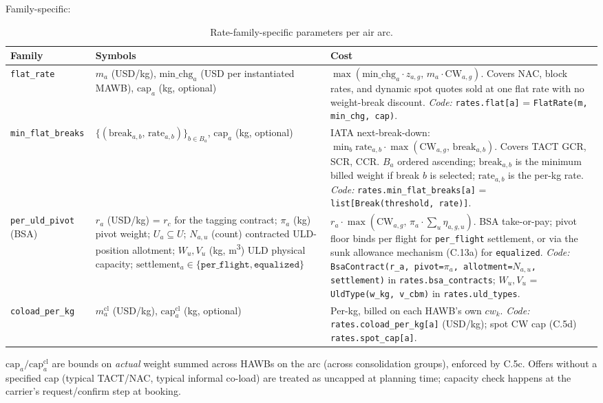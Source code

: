 \documentclass[11pt,a4paper]{article}
\theoremstyle{definition}
\begin{document}
Family-specific:

\begin{table}[H]
\centering
\caption{Rate-family-specific parameters per air arc.}
\label{tab:rate-family-params}
\begin{tabular}{lp{4.6cm}p{6.5cm}}
\toprule
Family & Symbols & Cost \\
\midrule
\texttt{flat\_rate} & $m_a$ (USD/kg), $\text{min\_chg}_a$ (USD per instantiated MAWB), $\text{cap}_a$ (kg, optional) & $\max(\text{min\_chg}_a \cdot z_{a,g},\, m_a \cdot \text{CW}_{a,g})$. Covers NAC, block rates, and dynamic spot quotes sold at one flat rate with no weight-break discount. \emph{Code:} \texttt{rates.flat[a]} = \texttt{FlatRate(m, min\_chg, cap)}. \\[0.3em]
\texttt{min\_flat\_breaks} & $\{(\text{break}_{a,b},\, \text{rate}_{a,b})\}_{b \in B_a}$, $\text{cap}_a$ (kg, optional) & IATA next-break-down: $\min_b \text{rate}_{a,b} \cdot \max(\text{CW}_{a,g},\, \text{break}_{a,b})$. Covers TACT GCR, SCR, CCR. $B_a$ ordered ascending; $\text{break}_{a,b}$ is the minimum billed weight if break $b$ is selected; $\text{rate}_{a,b}$ is the per-kg rate. \emph{Code:} \texttt{rates.min\_flat\_breaks[a]} = \texttt{list[Break(threshold, rate)]}. \\[0.3em]
\texttt{per\_uld\_pivot} (BSA) & $r_a$ (USD/kg) = $r_c$ for the tagging contract; $\pi_a$ (kg) pivot weight; $U_a \subseteq U$; $N_{a,u}$ (count) contracted ULD-position allotment; $W_u, V_u$ (kg, m\textsuperscript{3}) ULD physical capacity; $\text{settlement}_a \in \{\texttt{per\_flight}, \texttt{equalized}\}$ & $r_a \cdot \max(\text{CW}_{a,g},\, \pi_a \cdot \sum_u \eta_{a,g,u})$. BSA take-or-pay; pivot floor binds per flight for \texttt{per\_flight} settlement, or via the sunk allowance mechanism (C.13a) for \texttt{equalized}. \emph{Code:} \texttt{BsaContract(r\_a, pivot=}$\pi_a$\texttt{, allotment=}$N_{a,u}$\texttt{, settlement)} in \texttt{rates.bsa\_contracts}; $W_u, V_u$ = \texttt{UldType(w\_kg, v\_cbm)} in \texttt{rates.uld\_types}. \\[0.3em]
\texttt{coload\_per\_kg} & $m_a^{\text{cl}}$ (USD/kg), $\text{cap}_a^{\text{cl}}$ (kg, optional) & Per-kg, billed on each HAWB's own $cw_k$. \emph{Code:} \texttt{rates.coload\_per\_kg[a]} (USD/kg); spot CW cap (C.5d) \texttt{rates.spot\_cap[a]}. \\
\bottomrule
\end{tabular}
\end{table}

$\text{cap}_a / \text{cap}_a^{\text{cl}}$ are bounds on \emph{actual} weight
summed across HAWBs on the arc (across consolidation groups), enforced by
C.5c. Offers without a specified cap (typical TACT/NAC, typical informal
co-load) are treated as uncapped at planning time; capacity check happens at
the carrier's request/confirm step at booking.
\end{document}
